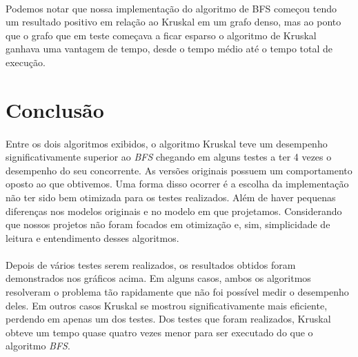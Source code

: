 \documentclass[12pt]{article}
\begin{document}
  \paragraph{}Podemos notar que nossa implementação do algoritmo de BFS começou tendo
   um resultado positivo em relação ao Kruskal em um grafo denso, mas ao ponto que o grafo
    que em teste começava a ficar esparso o algoritmo de Kruskal ganhava uma vantagem de
     tempo, desde o tempo médio até o tempo total de execução.
     
     

  \section{Conclusão}

  \paragraph{} Entre os dois algoritmos exibidos, o algoritmo Kruskal teve um desempenho significativamente superior ao \emph{BFS} chegando em alguns testes a ter 4 vezes o desempenho do seu concorrente. As versões originais possuem um comportamento oposto ao que obtivemos. Uma forma disso ocorrer é a escolha da implementação não ter sido bem otimizada para os testes realizados. Além de haver pequenas diferenças nos modelos originais e no modelo em que projetamos. Considerando que nossos projetos não foram focados em otimização e, sim, simplicidade de leitura e entendimento desses algoritmos. 
 \paragraph{} Depois de vários testes serem realizados, os resultados obtidos foram demonstrados nos gráficos acima. Em alguns casos, ambos os algoritmos resolveram o problema tão rapidamente que não foi possível medir o desempenho deles. Em outros casos Kruskal se mostrou significativamente mais eficiente, perdendo em apenas um dos testes. Dos testes que foram realizados, Kruskal obteve um tempo quase quatro vezes menor para ser executado do que o algoritmo \emph{BFS}.
\end{document}
